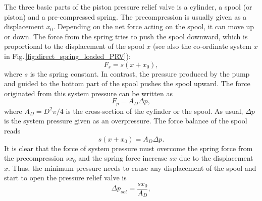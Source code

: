 The three basic parts of the piston pressure relief valve is a cylinder, a spool (or piston) and a pre-compressed spring. The precompression is usually given as a displacement $x_0$. Depending on the net force acting on the spool, it can move up or down. The force from the spring tries to push the spool downward, which is proportional to the displacement of the spool $x$ (see also the co-ordinate system $x$ in Fig.\,\ref{fig:direct_spring_loaded_PRV}):
%
\begin{equation}
F_s = s (x + x_0),
\end{equation}
%
where $s$ is the spring constant. In contrast, the pressure produced by the pump and guided to the bottom part of the spool pushes the spool upward. The force originated from this system pressure can be written as
%
\begin{equation}
F_p = A_D \Delta p,
\end{equation}
%
where $A_D=D^2 \pi / 4$ is the cross-section of the cylinder or the spool. As usual, $\Delta p$ is the system pressure given as an overpressure. The force balance of the spool reads
%
\begin{equation} \label{force_balance_of_the_spool}
s (x + x_0) = A_D \Delta p.
\end{equation}
%
It is clear that the force of system pressure must overcome the spring force from the precompression $s x_0$ and the spring force increase $s x$ due to the displacement $x$. Thus, the minimum pressure needs to cause any displacement of the spool and start to open the pressure relief valve is
%
\begin{equation} \label{definition_of_set_pressure}
\Delta p_{set} = \frac{s x_0}{A_D},
\end{equation}
%

